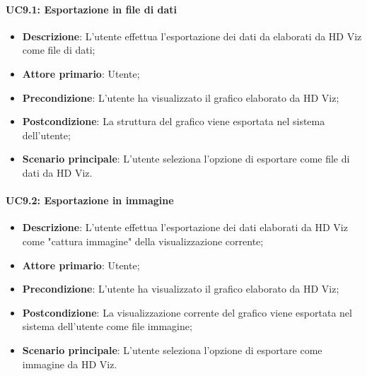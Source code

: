\paragraph{UC9.1: Esportazione in file di dati}
\begin{itemize}
    \item{\textbf{Descrizione}}: L'utente effettua l'esportazione dei dati da elaborati da HD Viz come file di dati;
    \item{\textbf{Attore primario}}: Utente;
    \item{\textbf{Precondizione}}: L'utente ha visualizzato il grafico elaborato da HD Viz;
    \item{\textbf{Postcondizione}}: La struttura del grafico viene esportata nel sistema dell'utente;
    \item{\textbf{Scenario principale}}: L'utente seleziona l'opzione di esportare come file di dati da HD Viz.
\end{itemize}

\paragraph{UC9.2: Esportazione in immagine}
\begin{itemize}
    \item{\textbf{Descrizione}}: L'utente effettua l'esportazione dei dati elaborati da HD Viz come "cattura immagine" della visualizzazione corrente;
    \item{\textbf{Attore primario}}: Utente;
    \item{\textbf{Precondizione}}: L'utente ha visualizzato il grafico elaborato da HD Viz;
    \item{\textbf{Postcondizione}}: La visualizzazione corrente del grafico viene esportata nel sistema dell'utente come file immagine;
    \item{\textbf{Scenario principale}}: L'utente seleziona l'opzione di esportare come immagine da HD Viz.
\end{itemize}
